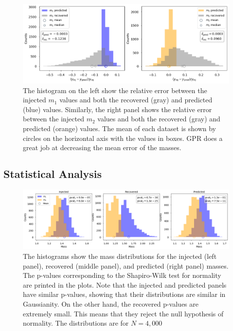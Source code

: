 \documentclass[aps,prd,twocolumn,superscriptaddress,preprintnumbers,floatfix,nofootinbib]{revtex4-2}
\begin{document}
\begin{figure}[!h]
  \centering
  \includegraphics[width=\linewidth]{m1_m2_error_analysis_wboxes.png}
  \caption{The histogram on the left show the relative error between the injected $m_1$ values and 
  		both the recovered (gray) and predicted (blue) values. Similarly, the right panel shows the 
		relative error between the injected $m_2$ values and both the recovered (gray) and 
		predicted (orange) values. The mean of each dataset is shown by circles on the horizontal 
		axis with the values in boxes. GPR does a great job at decreasing the mean error of the masses. }
  \label{fig:histogram}
\end{figure}

\subsection{Statistical Analysis}
%

\begin{figure}[t]
  \center
  \includegraphics[width=\linewidth]{shapiro_test.png}
  \caption{The histograms show the mass distributions for the injected (left panel), recovered (middle  
  panel), and predicted (right panel) masses. The p-values corresponding to the Shapiro-Wilk test for 
  normality are printed in the plots. Note that the injected and predicted panels have similar p-values, 
  showing that their distributions are similar in Gaussianity. On the other hand, the recovered p-values 
  are extremely small. This means that they reject the null hypothesis of normality. The distributions 
  are for $N=4,000$ }
  \label{fig:shapiro_test}
\end{figure}
\end{document}
